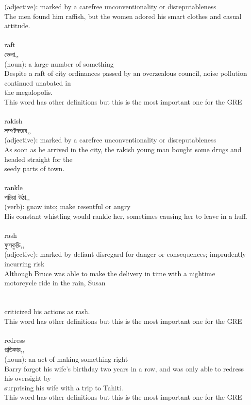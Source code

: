 \documentclass{article}
\begin{document}
{(adjective): marked by a carefree unconventionality or disreputableness\\The men found him raffish, but the women adored his smart clothes and casual attitude.\\}\\
{raft}\\
{ভেলা,,}\\
{(noun): a large number of something\\Despite a raft of city ordinances passed by an overzealous council, noise pollution continued unabated in\\the megalopolis.\\This word has other definitions but this is the most important one for the GRE\\}\\
{rakish}\\
{লম্পটস্বভাব,,}\\
{(adjective): marked by a carefree unconventionality or disreputableness\\As soon as he arrived in the city, the rakish young man bought some drugs and headed straight for the\\seedy parts of town.\\}\\
{rankle}\\
{পচিয়া উঠা,,}\\
{(verb): gnaw into; make resentful or angry\\His constant whistling would rankle her, sometimes causing her to leave in a huff.\\}\\
{rash}\\
{ফুসকুড়ি,,}\\
{(adjective): marked by defiant disregard for danger or consequences; imprudently incurring risk\\Although Bruce was able to make the delivery in time with a nightime motorcycle ride in the rain, Susan\\\\                                                                                \\criticized his actions as rash.\\This word has other definitions but this is the most important one for the GRE\\}\\
{redress}\\
{প্রতিকার,,}\\
{(noun): an act of making something right\\Barry forgot his wife's birthday two years in a row, and was only able to redress his oversight by\\surprising his wife with a trip to Tahiti.\\This word has other definitions but this is the most important one for the GRE\\}\\
\end{document}
